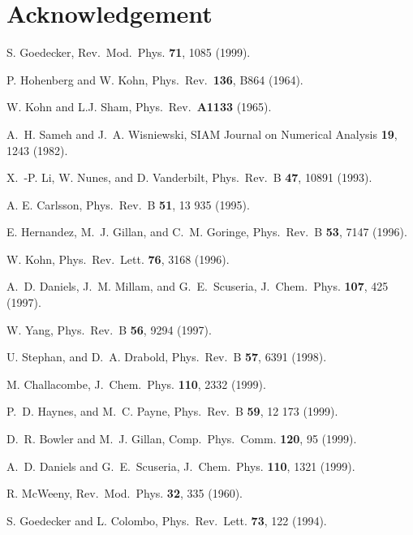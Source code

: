 \commentoutA{\documentclass[superbib,aps,prb,epsfig,floats,twocolumn]{revtex4}}
\begin{document}
\section{Acknowledgement}






\begin{references}

 S. Goedecker,
Rev.\ Mod.\ Phys. {\bf 71}, 1085 (1999).

 P. Hohenberg and W. Kohn,
Phys.\ Rev.\ {\bf 136}, B864 (1964).

 W. Kohn and L.J. Sham,
Phys.\ Rev.\ {\bf A1133} (1965).

  A.\ H. Sameh and J.\ A. Wisniewski,
SIAM Journal on Numerical Analysis {\bf 19}, 1243 (1982).

 X.\ -P. Li, W. Nunes, and D. Vanderbilt,
Phys.\ Rev.\ B {\bf 47}, 10891 (1993).

 A. E. Carlsson,
Phys.\ Rev.\ B {\bf 51}, 13 935 (1995).

 E. Hernandez, M.\ J. Gillan, and C.\ M. Goringe,
Phys.\ Rev.\ B {\bf 53}, 7147 (1996).

 W. Kohn,
Phys.\ Rev.\ Lett. {\bf 76}, 3168 (1996).

 A.\ D. Daniels, J.\ M. Millam, and G.\ E.\ Scuseria,
J.\ Chem.\ Phys. {\bf 107}, 425 (1997).

 W. Yang,
Phys.\ Rev.\ B {\bf 56}, 9294 (1997).

 U. Stephan, and D.\ A. Drabold,
Phys.\ Rev.\ B {\bf 57}, 6391 (1998).

 M. Challacombe,
J.\ Chem.\ Phys. {\bf 110}, 2332 (1999).

 P.\ D. Haynes, and M.\ C. Payne,
Phys.\ Rev.\ B {\bf 59}, 12 173 (1999).

 D.\ R. Bowler and M.\ J. Gillan,
Comp.\ Phys.\ Comm. {\bf 120}, 95 (1999).

 A.\ D. Daniels and G.\ E.\ Scuseria,
J.\ Chem.\ Phys. {\bf 110}, 1321 (1999).

 R. McWeeny,
Rev.\ Mod.\ Phys. {\bf 32}, 335 (1960).

 S. Goedecker and L. Colombo,
Phys.\ Rev.\ Lett. {\bf 73}, 122 (1994).


\end{references}
\end{document}
